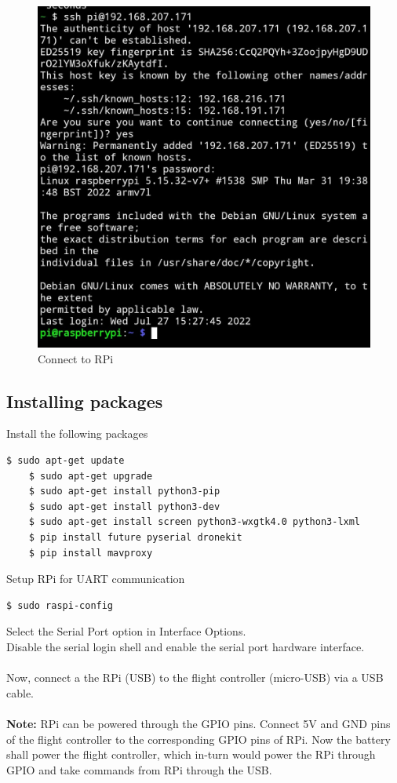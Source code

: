 \documentclass{article}
\begin{document}
\begin{figure}[!htb]
              \includegraphics[width=\linewidth]{./figs/termux/ssh.jpeg}
              \caption{Connect to RPi}\label{fig:awesome_image3}
            \endminipage
\end{figure}

\subsection{Installing packages}
Install the following packages
\begin{lstlisting}[language=bash]
    $ sudo apt-get update
    $ sudo apt-get upgrade
    $ sudo apt-get install python3-pip
    $ sudo apt-get install python3-dev
    $ sudo apt-get install screen python3-wxgtk4.0 python3-lxml
    $ pip install future pyserial dronekit
    $ pip install mavproxy
\end{lstlisting}
 
\noindent Setup RPi for UART communication
\begin{lstlisting}[language=bash]
    $ sudo raspi-config
\end{lstlisting}
Select the Serial Port option in Interface Options.\\
Disable the serial login shell and enable the serial port hardware interface. 
\\
\\
Now, connect a the RPi (USB) to the flight controller (micro-USB) via a USB cable. \\
\\
\textbf{Note:} RPi can be powered through the GPIO pins. Connect 5V and GND pins of the flight controller to the corresponding GPIO pins of RPi. Now the battery shall power the flight controller, which in-turn would power the RPi through GPIO and take commands from RPi through the USB. \\
\end{document}
